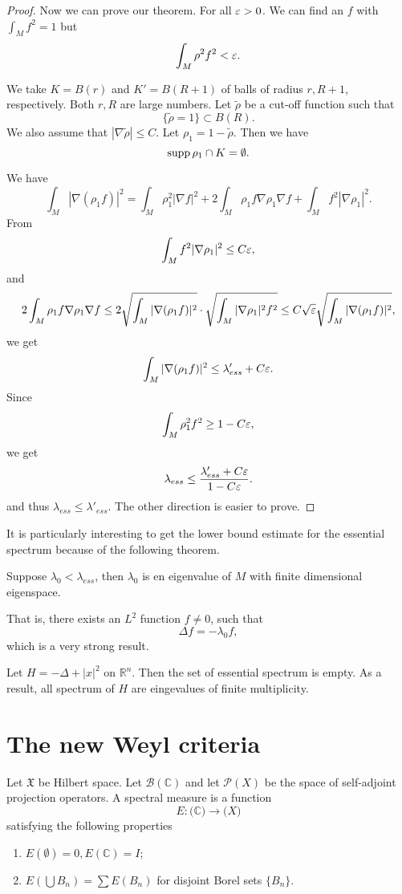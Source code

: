 \begin{proof}
Now we can prove our theorem.  For all $\varepsilon>0$. We can find an $f$ with $\int_M f^2=1$ but 
\[
\int_M\rho^2f^2<\varepsilon.
\]

We take $K=B(r)$ and $K'=B(R+1)$ of balls of radius $r, R+1$, respectively. Both $r,R$ are large numbers. Let $\tilde\rho$ be a cut-off function such that 
\[
\{\tilde\rho=1\}\subset B(R).
\]
We also assume that $|\nabla\tilde\rho|\leq C$. Let $\rho_1=1-\tilde\rho$. Then we have
\[
{\rm supp}\,\rho_1\cap K=\emptyset.
\]



We have
\[
\int_M|\nabla(\rho_1f)|^2=\int_M\rho_1^2|\nabla f|^2+2\int_M\rho_1f\nabla\rho_1\nabla f+\int_M f^2|\nabla \rho_1|^2.
\]
From
\[
\int_M f^2|\nabla \rho_1|^2\leq C\varepsilon,
\]
and 
\[
2\int_M\rho_1 f\nabla \rho_1\nabla f\leq 2 \sqrt{\int_M |\nabla(\rho_1 f)|^2}\cdot \sqrt{\int_M |\nabla\rho_1|^2f^2}\leq C\sqrt{\varepsilon}
\sqrt{\int_M |\nabla(\rho_1 f)|^2},
\]
we get
\[
\int_M|\nabla (\rho_1f)|^2\leq\lambda_{ess}'+C\varepsilon.
\]
Since
\[
\int_M\rho_1^2f^2\geq 1-C\varepsilon,
\]
we get
\[\lambda_{ess}\leq\frac{\lambda_{ess}'+C\varepsilon}{1-C\varepsilon}.
\]
and thus $\lambda_{ess}\leq\lambda'_{ess}$. The other direction is easier to prove.


\end{proof}

 It is particularly interesting to get the lower bound estimate for the essential spectrum because of the following theorem.

\begin{theorem} 
Suppose $\lambda_0<\lambda_{ess}$, then $\lambda_0$ is en eigenvalue of $M$ with finite dimensional eigenspace.
\end{theorem}


That is, there exists an $L^2$ function $f\neq 0$, such that 
\[
\Delta f=-\lambda_0 f,
\]
which is a very strong result.


\begin{example}
Let $H=-\Delta+|x|^2$ on $\mathbb R^n$. Then the set of essential spectrum is empty. As a result, all spectrum of $H$ are eingevalues of finite multiplicity.
\end{example}


\section{The new Weyl criteria}

Let $\mathfrak X$ be Hilbert space. Let $\mathscr B(\mathbb C)$ and let $\mathcal P(X)$ be the space of self-adjoint projection operators.  A spectral measure is a function
\[
E: \mathscr(\mathbb C)\to \mathcal (X)
\]
satisfying  the following properties
\begin{enumerate}
\item $E(\emptyset)=0, E(\mathbb C)=I$;
\item $E(\bigcup B_n)=\sum E(B_n)$ for disjoint Borel sets $\{B_n\}$.
\end{enumerate}

